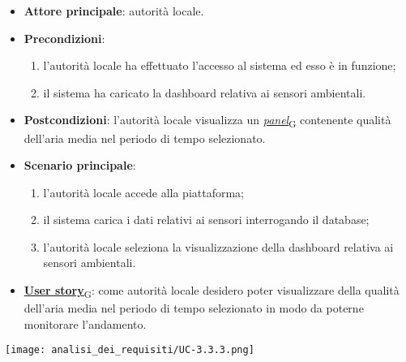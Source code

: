 \begin{itemize}
	\item \textbf{Attore principale}: autorità locale.
	\item \textbf{Precondizioni}:
	      \begin{enumerate}
		      \item l'autorità locale ha effettuato l'accesso al sistema ed esso è in funzione;
		      \item il sistema ha caricato la dashboard relativa ai sensori ambientali.
	      \end{enumerate}
	\item \textbf{Postcondizioni}: l'autorità locale visualizza un \href{https://7last.github.io/docs/pb/documentazione-interna/glossario\#panel}{\textit{panel}\textsubscript{G}} contenente qualità dell'aria media nel periodo di tempo selezionato.
	\item \textbf{Scenario principale}:
	      \begin{enumerate}
		      \item l'autorità locale accede alla piattaforma;
		      \item il sistema carica i dati relativi ai sensori interrogando il database;
		      \item l'autorità locale seleziona la visualizzazione della dashboard relativa ai sensori ambientali.
	      \end{enumerate}
	\item \href{https://7last.github.io/docs/pb/documentazione-interna/glossario\#user-story}{\textbf{User story}\textsubscript{G}}: come autorità locale desidero poter visualizzare della qualità dell'aria media nel periodo di tempo selezionato
	      in modo da poterne monitorare l'andamento.
\end{itemize}
\begin{center}
	\texttt{[image: analisi\_dei\_requisiti/UC-3.3.3.png]}
\end{center}


